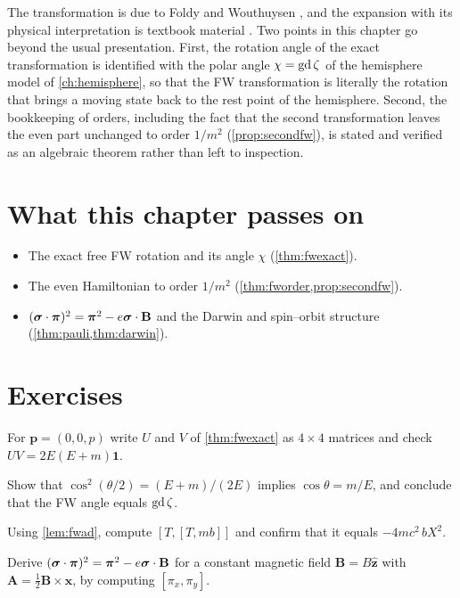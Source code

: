 \begin{litbox}
The transformation is due to Foldy and Wouthuysen \cite{FoldyWouthuysen1950}, and the expansion with its physical interpretation is textbook material \cite{BjorkenDrell}. Two points in this chapter go beyond the usual presentation. First, the rotation angle of the exact transformation is identified with the polar angle $\chi=\operatorname{gd}\zeta$ of the hemisphere model of \cref{ch:hemisphere}, so that the FW transformation is literally the rotation that brings a moving state back to the rest point of the hemisphere. Second, the bookkeeping of orders, including the fact that the second transformation leaves the even part unchanged to order $1/m^2$ (\cref{prop:secondfw}), is stated and verified as an algebraic theorem rather than left to inspection.
\end{litbox}

\section*{What this chapter passes on}
\begin{itemize}[nosep]
\item The exact free FW rotation and its angle $\chi$ (\cref{thm:fwexact}).
\item The even Hamiltonian to order $1/m^2$ (\cref{thm:fworder,prop:secondfw}).
\item $(\boldsymbol{\sigma}\cdot\bm\pi)^2=\bm\pi^2-e\boldsymbol{\sigma}\cdot\mathbf B$ and the Darwin and spin--orbit structure (\cref{thm:pauli,thm:darwin}).
\end{itemize}

\section*{Exercises}
\begin{exercise}
For $\mathbf p=(0,0,p)$ write $U$ and $V$ of \cref{thm:fwexact} as $4\times4$ matrices and check $UV=2E(E+m)\mathbf 1$.
\end{exercise}
\begin{exercise}
Show that $\cos^2(\theta/2)=(E+m)/(2E)$ implies $\cos\theta=m/E$, and conclude that the FW angle equals $\operatorname{gd}\zeta$.
\end{exercise}
\begin{exercise}
Using \cref{lem:fwad}, compute $[T,[T,mb]]$ and confirm that it equals $-4mc^2\,bX^2$.
\end{exercise}
\begin{exercise}
Derive $(\boldsymbol{\sigma}\cdot\bm\pi)^2=\bm\pi^2-e\boldsymbol{\sigma}\cdot\mathbf B$ for a constant magnetic field $\mathbf B=B\hat{\mathbf z}$ with $\mathbf A=\frac12\mathbf B\times\mathbf x$, by computing $[\pi_x,\pi_y]$.
\end{exercise}

